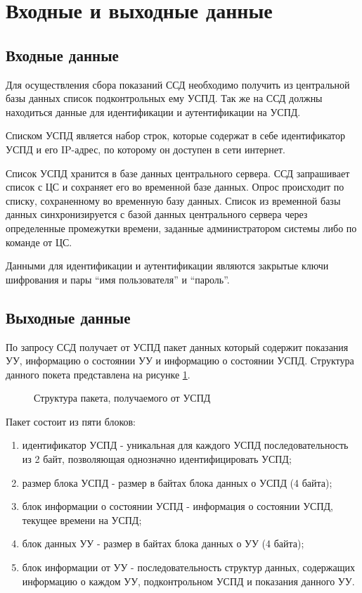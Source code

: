 \newpage
\section{Входные и выходные данные}
\setcounter{figure}{0}

\subsection{Входные данные}
Для осуществления сбора показаний ССД необходимо получить из центральной базы данных список подконтрольных ему УСПД. Так же на ССД должны находиться данные для идентификации и аутентификации на УСПД. 

Списком УСПД является набор строк, которые содержат в себе идентификатор УСПД и его IP-адрес, по которому он доступен в сети интернет.

Список УСПД хранится в базе данных центрального сервера. ССД запрашивает список с ЦС и сохраняет его во временной базе данных. Опрос происходит по списку, сохраненному во временную базу данных. Список из временной базы данных синхронизируется с базой данных центрального сервера через определенные промежутки времени, заданные администратором системы либо по команде от ЦС.

Данными для идентификации и аутентификации являются закрытые ключи шифрования и пары ``имя пользователя'' и ``пароль''.


\subsection{Выходные данные}

По запросу ССД получает от УСПД пакет данных который содержит показания УУ, информацию о состоянии УУ и информацию о состоянии УСПД. Структура данного покета представлена на рисунке \ref{img:answer_struct}.

\begin{figure}[!ht]
 \caption{Структура пакета, получаемого от УСПД}
 \label{img:answer_struct}
\end{figure}

\newpage
Пакет состоит из пяти блоков:

\begin{enumerate}
 \item идентификатор УСПД - уникальная для каждого УСПД последовательность из 2 байт, позволяющая однозначно идентифицировать УСПД;
 \item размер блока УСПД - размер в байтах блока данных о УСПД (4 байта);
 \item блок информации о состоянии УСПД - информация о состоянии УСПД, текущее времени на УСПД;
 \item блок данных УУ - размер в байтах блока данных о УУ (4 байта);
 \item блок информации от УУ - последовательность структур данных, содержащих информацию о каждом УУ, подконтрольном УСПД и показания данного УУ.
\end{enumerate}

